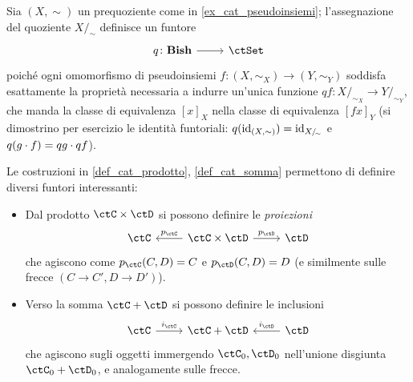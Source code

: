 \begin{example}
 Sia \((X,\sim)\) un prequoziente come in \ref{ex_cat_pseudoinsiemi}; l'assegnazione del quoziente \(X/_\sim\) definisce un funtore
 \[\dmFun q{\cate{Bish}}{\ctSet}\]
 poiché ogni omomorfismo di pseudoinsiemi \(f \colon (X,\sim_X)\to (Y,\sim_Y)\) soddisfa esattamente la proprietà necessaria a indurre un'unica funzione \(qf \colon X/_{\!\sim_X}\to Y/_{\!\sim_Y}\), che manda la classe di equivalenza \([x]_X\) nella classe di equivalenza \([fx]_Y\) (si dimostrino per esercizio le identità funtoriali: \(q(\mathrm{id}_{(X,\sim)})=\mathrm{id}_{X/_{\!\sim}}\) e \(q(g\cdot f)=qg\cdot qf\)).
\end{example}
\begin{example}
 Le costruzioni in \ref{def_cat_prodotto}, \ref{def_cat_somma} permettono di definire diversi funtori interessanti:
 \begin{itemize}
  \item Dal prodotto \(\ctC\times\ctD\) si possono definire le \emph{proiezioni}
        \[\begin{tikzcd}
          \ctC & {\ctC\times\ctD} & \ctD
          \arrow["{p_\ctC}"', from=1-2, to=1-1]
          \arrow["{p_\ctD}", from=1-2, to=1-3]
         \end{tikzcd}\]
        che agiscono come \(p_\ctC(C,D)=C\) e \(p_\ctD(C,D)=D\) (e similmente sulle frecce \((C\to C', D\to D')\)).
  \item Verso la somma \(\ctC+\ctD\) si possono definire le inclusioni
        \[\begin{tikzcd}
          \ctC & {\ctC+\ctD} & \ctD
          \arrow["{i_\ctC}", from=1-1, to=1-2]
          \arrow["{i_\ctD}"', from=1-3, to=1-2]
         \end{tikzcd}\]
        che agiscono sugli oggetti immergendo \(\ctC_0,\ctD_0\) nell'unione disgiunta \(\ctC_0+\ctD_0\), e analogamente sulle frecce.
 \end{itemize}
\end{example}
